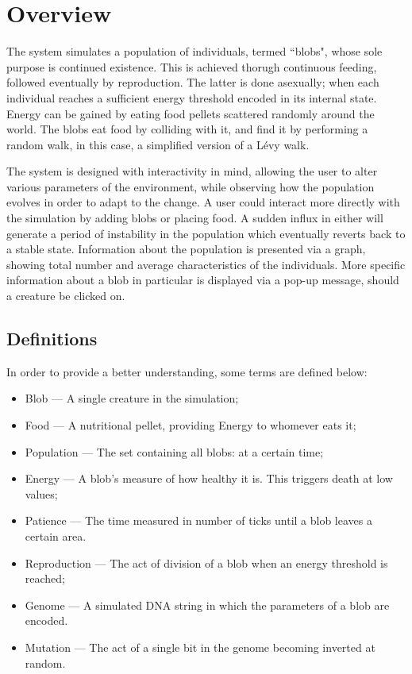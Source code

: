 \section{Overview}
The system simulates a population of individuals, termed ``blobs", whose sole purpose is continued existence. This is achieved thorugh continuous feeding, followed eventually by reproduction. The latter is done asexually; when each individual reaches a sufficient energy threshold encoded in its internal state. Energy can be gained by eating food pellets scattered randomly around the world. The blobs eat food by colliding with it, and find it by performing a random walk, in this case, a simplified version of a L\'evy walk\cite{matthaus2009coli}.

The system is designed with interactivity in mind, allowing the user to alter various parameters of the environment, while observing how the population evolves in order to adapt to the change. A user could interact more directly with the simulation by adding blobs or placing food. A sudden influx in either will generate a period of instability in the population which eventually reverts back to a stable state. Information about the population is presented via a graph, showing total number and average characteristics of the individuals. More specific information about a blob in particular is displayed via a pop-up message, should a creature be clicked on.

\subsection{Definitions}
In order to provide a better understanding, some terms are defined below:

\begin{itemize}
	\item Blob --- A single creature in the simulation;
	\item Food --- A nutritional pellet, providing Energy to whomever eats it;
	\item Population --- The set containing all blobs: at a certain time;
	\item Energy --- A blob's measure of how healthy it is. This triggers death at low values;
	\item Patience --- The time measured in number of ticks until a blob leaves a certain area.
	\item Reproduction --- The act of division of a blob when an energy threshold is reached;
	\item Genome --- A simulated DNA string in which the parameters of a blob are encoded.
	\item Mutation --- The act of a single bit in the genome becoming inverted at random.
\end{itemize}

